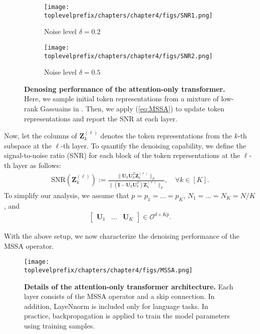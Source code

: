 \documentclass[\toplevelprefix/book-main.tex]{subfiles}
\begin{document}
\begin{figure}[t]
    \begin{subfigure}[t]{0.45\textwidth}
        \centering
        \texttt{[image: \\toplevelprefix/chapters/chapter4/figs/SNR1.png]}
        \caption{Noise level $\delta = 0.2$}
    \end{subfigure}
    \hfill
    \begin{subfigure}[t]{0.45\textwidth}
        \centering
        \texttt{[image: \\toplevelprefix/chapters/chapter4/figs/SNR2.png]}
        \caption{Noise level $\delta = 0.5$}
    \end{subfigure}
    \caption{{\bf Denosing performance of the attention-only transformer.} Here, we sample initial token representations from a mixture of low-rank Gassuains in . Then, we apply (\ref{eq:MSSA}) to update token representations and report the SNR at each layer.}  \label{fig:MSSA} 
\end{figure} 


Now, let the columns of $\bm Z_k^{(\ell)}$ denotes the token representations from the $k$-th subspace at the $\ell$-th layer. To quantify the denoising capability, we define the signal-to-noise ratio (SNR) for each block of the token representations at the $\ell$-th layer as follows: 
\begin{align}\label{def:SNR}
\mathrm{SNR}(\bm Z_k^{(\ell)}) :=  \frac{\|\bm U_k\bm U_k^T\bm Z_k^{(\ell)} \|_F}{\|(\bm I - \bm U_k\bm U_k^T)\bm Z_k^{(\ell)} \|_F},\quad \forall k \in [K].
\end{align}
To simplify our analysis, we assume that $p=p_1=\dots=p_K$, $N_1=\dots=N_K=N/K$, and 
\begin{align}\label{eq:orth}
\begin{bmatrix}
\bm U_1 & \dots & \bm U_K
\end{bmatrix} \in \mathcal{O}^{d\times Kp}. 
\end{align}  

With the above setup, we now characterize the denoising performance of the MSSA operator.

\begin{figure*}[t]
\begin{center}
        \texttt{[image: \\toplevelprefix/chapters/chapter4/figs/MSSA.png]}
    \caption{\textbf{Details of the attention-only transformer architecture.} Each layer consists of the MSSA operator and a skip connection. In addition, LayeNnorm is included only for language tasks. In practice, backpropagation is applied to train the model parameters using training samples. %
    }\label{fig:transformer}
\end{center} 
\end{figure*}
\end{document}
